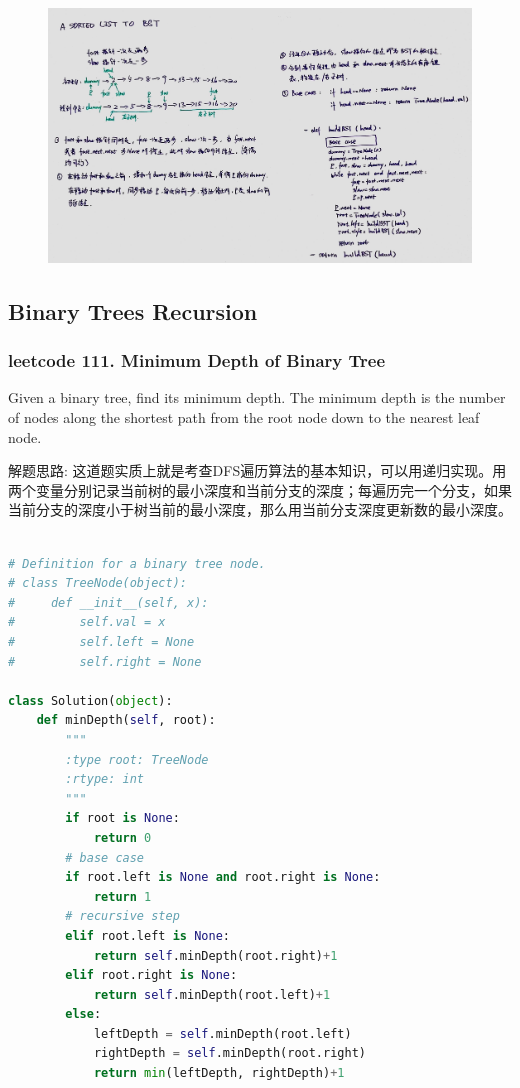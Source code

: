 \documentclass[a4paper,10pt]{article}
\begin{document}
\begin{figure}[h]
    \includegraphics[width=1\textwidth]{leetcode109.jpg}
    \centering\\
\end{figure}






\subsection{Binary Trees Recursion}

\subsubsection{leetcode 111. Minimum Depth of Binary Tree}
Given a binary tree, find its minimum depth. The minimum depth is the number of nodes along the shortest path from the root node down to the nearest leaf node. \\

\begin{CJK*}{UTF8}{gbsn}
\noindent 解题思路: 这道题实质上就是考查DFS遍历算法的基本知识，可以用递归实现。用两个变量分别记录当前树的最小深度和当前分支的深度；每遍历完一个分支，如果当前分支的深度小于树当前的最小深度，那么用当前分支深度更新数的最小深度。\\
\end{CJK*}

\begin{lstlisting}[language=Python, caption=Problem111. Minimum Depth of Binary Tree]

# Definition for a binary tree node.
# class TreeNode(object):
#     def __init__(self, x):
#         self.val = x
#         self.left = None
#         self.right = None

class Solution(object):
    def minDepth(self, root):
        """
        :type root: TreeNode
        :rtype: int
        """
        if root is None:
            return 0
        # base case
        if root.left is None and root.right is None:
            return 1
        # recursive step
        elif root.left is None:
            return self.minDepth(root.right)+1
        elif root.right is None:
            return self.minDepth(root.left)+1
        else:
            leftDepth = self.minDepth(root.left)
            rightDepth = self.minDepth(root.right)
            return min(leftDepth, rightDepth)+1
\end{lstlisting}
\end{document}
